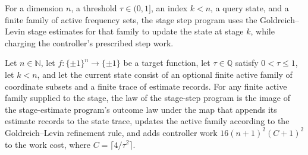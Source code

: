 \begin{definition}
\label{FABL.goldreichLevinStageStepProgram}
\leanok
{}
For a dimension $n$, a threshold $\tau\in(0,1]$, an index $k<n$, a query state, and a
finite family of active frequency sets, the stage step program uses the Goldreich–Levin
stage estimates for that family to update the state at stage $k$, while charging the
controller’s prescribed step work.
\end{definition}

\begin{theorem}
\label{FABL.runWithCost_goldreichLevinStageStepProgram}
\leanok
{}
Let $n\in\mathbb N$, let $f:\{\pm1\}^n\to\{\pm1\}$ be a target function, let
$\tau\in\mathbb Q$ satisfy $0<\tau\le1$, let $k<n$, and let the current state consist of
an optional finite active family of coordinate subsets and a finite trace of estimate
records. For any finite active family supplied to the stage, the law of the stage-step
program is the image of the stage-estimate program's outcome law under the map that
appends its estimate records to the state trace, updates the active family according to
the Goldreich–Levin refinement rule, and adds controller work $16(n+1)^2(C+1)^2$ to the
work cost, where $C=\lceil4/\tau^2\rceil$.
\end{theorem}

